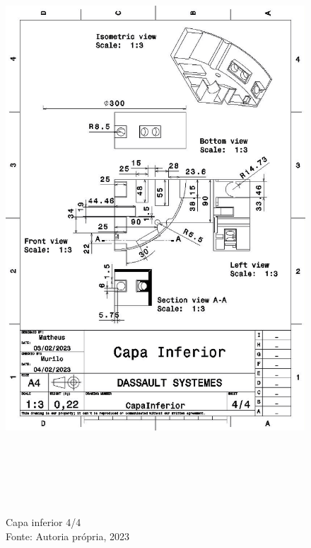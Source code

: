 \newpage
\pagebreak
\begin{figure}[h!]
\centering
\includegraphics[width=16cm,height=22cm]{figuras/CapaInferior4_4.jpg}
\caption{Capa inferior 4/4\\Fonte: Autoria própria, 2023}
\label{CapaInferior4_4}
\end{figure}

